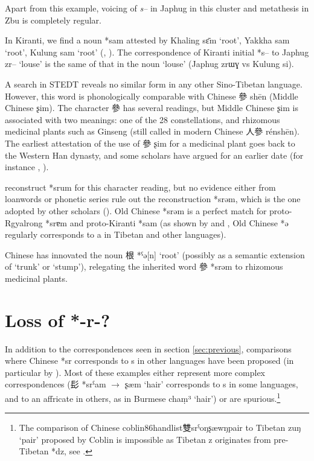 \documentclass[oldfontcommands,oneside,a4paper,11pt]{article}
\newcommand{\ipa}[1]{{\phon #1}} %
\newcommand{\zh}[1]{{\cn #1}}
\newcommand{\archaic}[4]{\zh{#1} *\ipa{#2} $\rightarrow$ \ipa{#3} `#4'}
\begin{document}
Apart from this example, voicing of \textit{s--} in Japhug in this cluster and metathesis in Zbu is completely regular.

In Kiranti, we find a noun *\ipa{sam} attested by Khaling \ipa{sɛ̄m} `root', Yakkha  \ipa{sam} `root', Kulung \ipa{sam} `root' (\citealt{kongren07yakkha}, \citealt{tolsma06kulung}). The correspondence of Kiranti initial *s--  to Japhug \ipa{zr--} `louse' is the same of that in the noun `louse' (Japhug \ipa{zrɯɣ} vs Kulung \ipa{si}).

A search in STEDT reveals no similar form in any other Sino-Tibetan language. However, this word is phonologically comparable with Chinese \zh{參} \ipa{shēn} (Middle Chinese \ipa{ʂim}). The character  \zh{參} has several readings, but Middle Chinese \ipa{ʂim} is associated with two meanings: one of the 28 constellations, and rhizomous medicinal plants such as Ginseng (still called in modern Chinese \zh{人參} \ipa{rénshēn}). The earliest attestation of the use of \zh{參} \ipa{ʂim} for a medicinal plant goes back to the Western Han dynasty, and some scholars have argued for an earlier date (for instance \citealt{xu11shen}, \citealt{sun92renshen}). 

 \citet[75]{bs14oc} reconstruct *\ipa{srum} for this character reading, but no evidence either from loanwords or phonetic series rule out the reconstruction *\ipa{srəm}, which is the one adopted by other scholars (\citealt{schuessler06}). Old Chinese *\ipa{srəm} is a perfect match for proto-Rgyalrong *\ipa{srɐm} and proto-Kiranti *\ipa{sam} (as shown by \citealt{gong95st} and \citealt{hill12sixvowels}, Old Chinese *\ipa{ə} regularly corresponds to \ipa{a} in Tibetan and other languages).

Chinese has innovated the noun \zh{根} *\ipa{[k]ˁə[n]} `root' (possibly as a semantic extension of `trunk' or `stump'), relegating the inherited word \zh{參} *\ipa{srəm} to rhizomous medicinal plants.

\section{Loss of *-r-?}
In addition to the correspondences seen in section \ref{sec:previous}, comparisons where Chinese *\ipa{sr} corresponds to \ipa{s} in other languages have been proposed (in particular by \citealt{coblin86handlist}). Most of these examples either represent more complex correspondences (\archaic{髟}{srˁam}{ʂæm}{hair} corresponds to \ipa{s} in some languages, and to an affricate in others, as in Burmese \ipa{chaṃ³} `hair') or are spurious.\footnote{The comparison of Chinese coblin86handlist{雙}{srˁoŋ}{ʂæwŋ}{pair} to Tibetan \ipa{zuŋ} `pair' proposed by Coblin is impossible as Tibetan \ipa{z} originates from pre-Tibetan *\ipa{dz}, see \citet{hill14dz}. }
\end{document}
